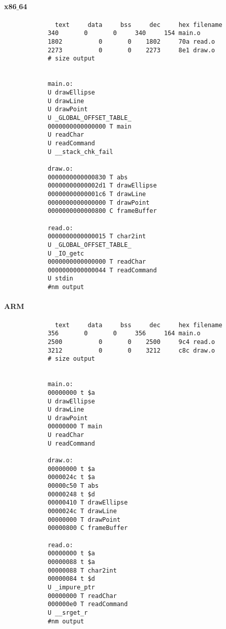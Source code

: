 \documentclass{article}
\begin{document}
		\paragraph{x86$\_$64}
		\begin{center}
		\begin{lstlisting}
			  text	   data	    bss	    dec	    hex	filename
			340	      0	      0	    340	    154	main.o
			1802	      0	      0	   1802	    70a	read.o
			2273	      0	      0	   2273	    8e1	draw.o
			# size output
			
			
			main.o:
			U drawEllipse
			U drawLine
			U drawPoint
			U _GLOBAL_OFFSET_TABLE_
			0000000000000000 T main
			U readChar
			U readCommand
			U __stack_chk_fail
			
			draw.o:
			0000000000000830 T abs
			00000000000002d1 T drawEllipse
			00000000000001c6 T drawLine
			0000000000000000 T drawPoint
			0000000000000800 C frameBuffer
			
			read.o:
			0000000000000015 T char2int
			U _GLOBAL_OFFSET_TABLE_
			U _IO_getc
			0000000000000000 T readChar
			0000000000000044 T readCommand
			U stdin
			#nm output
		\end{lstlisting}	
		\end{center}
		
		\paragraph{ARM}
		\begin{center}
		\begin{lstlisting}
			  text	   data	    bss	    dec	    hex	filename
			356	      0	      0	    356	    164	main.o
			2500	      0	      0	   2500	    9c4	read.o
			3212	      0	      0	   3212	    c8c	draw.o
			# size output
			
			
			main.o:
			00000000 t $a
			U drawEllipse
			U drawLine
			U drawPoint
			00000000 T main
			U readChar
			U readCommand
			
			draw.o:
			00000000 t $a
			0000024c t $a
			00000c50 T abs
			00000248 t $d
			00000410 T drawEllipse
			0000024c T drawLine
			00000000 T drawPoint
			00000800 C frameBuffer
			
			read.o:
			00000000 t $a
			00000088 t $a
			00000088 T char2int
			00000084 t $d
			U _impure_ptr
			00000000 T readChar
			000000e0 T readCommand
			U __srget_r
			#nm output
		\end{lstlisting}
		\end{center}
		
\end{document}
